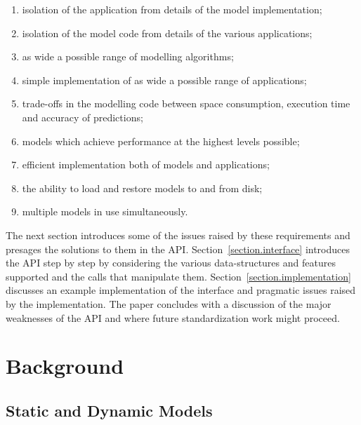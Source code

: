 \documentclass[11pt]{article}
\begin{document}
\begin{enumerate}
\item  isolation of the application from details of the model implementation;

\item  isolation of the model code from details of the various applications;

\item  as wide a possible range of modelling algorithms;

\item  simple implementation of as wide a possible range of applications;

\item  trade-offs in the modelling code between space consumption, execution
time and accuracy of predictions;

\item  models which achieve performance at the highest levels possible;

\item  efficient implementation both of models and applications;

\item  the ability to load and restore models to and from disk;

\item  multiple models in use simultaneously.
\end{enumerate}

The next section introduces some of the issues raised by these requirements
and presages the solutions to them in the API.
Section~\ref{section.interface} introduces the API step by step by
considering the various data-structures and features supported and the
calls that manipulate them.
Section~\ref{section.implementation} discusses an example implementation of the
interface and pragmatic issues raised by the implementation. The paper
concludes with a discussion of the major weaknesses of the API
and where future standardization work might proceed.

\section{Background}

\label{section.background}

\subsection{Static and Dynamic Models}
\end{document}

